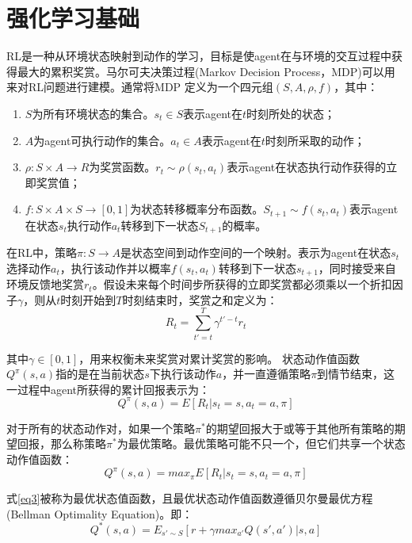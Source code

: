 \documentclass[bachelor]{thesis-uestc}
\begin{document}
	\section{强化学习基础}
	RL是一种从环境状态映射到动作的学习，目标是使agent在与环境的交互过程中获得最大的累积奖赏\cite{sutton1998reinforcement}。马尔可夫决策过程(Markov Decision Process，MDP)可以用来对RL问题进行建模。通常将MDP 定义为一个四元组$(S,A,\rho,f)$，其中：
	
	\begin{enumerate}
		\item $S$为所有环境状态的集合。$s_t\in S$表示agent在$t$时刻所处的状态；
		\item $A$为agent可执行动作的集合。$a_t\in A$表示agent在$t$时刻所采取的动作；
		\item $\rho:S\times A\rightarrow R$为奖赏函数。$r_t\sim \rho(s_t,a_t)$表示agent在状态执行动作获得的立即奖赏值；
		\item $f:S\times A\times S\rightarrow [0,1]$为状态转移概率分布函数。$S_{t+1}\sim f(s_t,a_t)$表示agent在状态$s_t$执行动作$a_t$转移到下一状态$S_{t+1}$的概率。
	\end{enumerate}
	
	在RL中，策略$\pi :S\rightarrow A$是状态空间到动作空间的一个映射。表示为agent在状态$s_t$选择动作$a_t$，执行该动作并以概率$f(s_t,a_t)$转移到下一状态$s_{t+1}$，同时接受来自环境反馈地奖赏$r_t$。假设未来每个时间步所获得的立即奖赏都必须乘以一个折扣因子$\gamma$，则从$t$时刻开始到$T$时刻结束时，奖赏之和定义为：
	\begin{equation}\label{eq1}
	R_t=\sum^T_{t'=t}\gamma^{t'-t}r_t
	\end{equation}
	
	其中$\gamma\in [0,1]$，用来权衡未来奖赏对累计奖赏的影响。
	状态动作值函数$Q^\pi (s,a)$指的是在当前状态$s$下执行该动作$a$，并一直遵循策略$\pi$到情节结束，这一过程中agent所获得的累计回报表示为：
	\begin{equation}\label{eq2}
	Q^\pi (s,a)=E[R_t|s_t=s,a_t=a,\pi]
	\end{equation}
	
	对于所有的状态动作对，如果一个策略$\pi ^*$的期望回报大于或等于其他所有策略的期望回报，那么称策略$\pi ^*$为最优策略。最优策略可能不只一个，但它们共享一个状态动作值函数：
	\begin{equation}\label{eq3}
	Q^\pi (s,a)=max_\pi E[R_t|s_t=s,a_t=a,\pi]
	\end{equation}
	
	式\ref{eq3}被称为最优状态值函数，且最优状态动作值函数遵循贝尔曼最优方程(Bellman Optimality Equation)。即：
	\begin{equation}
	\label{eq4}
	Q^*(s,a)=E_{s'\sim S}[r+\gamma max_{a'}Q(s',a')|s,a]
	\end{equation}
	
\end{document}
